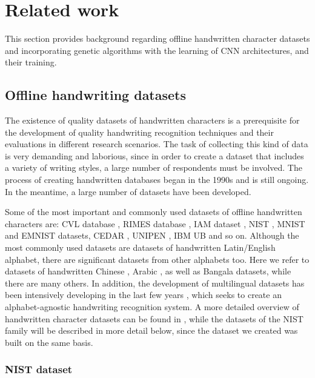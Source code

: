 \documentclass[eng]{simposium}
\begin{document}
\section{Related work} 

This section provides background regarding offline handwritten character datasets and incorporating genetic algorithms  
with the learning of CNN architectures, and their training.  

\subsection{Offline handwriting datasets} 

The existence of quality datasets of handwritten characters is a prerequisite for the development of quality handwriting  
recognition techniques and their evaluations in different research scenarios.  
The task of collecting this kind of data is very demanding and laborious, since in order to create a dataset that includes  
a variety of writing styles, a large number of respondents must be involved.  
The process of creating handwritten databases began in the 1990s \cite{9} and is still ongoing.  
In the meantime, a large number of datasets have been developed.  

Some of the most important and commonly used datasets of offline handwritten characters are: CVL database \cite{18}, RIMES database \cite{10}, 
IAM dataset \cite{11},  
NIST \cite{12,13}, MNIST \cite{8} and EMNIST \cite{1} datasets, CEDAR \cite{14}, UNIPEN \cite{15}, IBM UB \cite{16} and so on.  
Although the most commonly used datasets are datasets of handwritten Latin/English alphabet,  
there are significant datasets from other alphabets too.  
Here we refer to datasets of handwritten Chinese \cite{19,21,20}, Arabic \cite{22,23}, as well as Bangala \cite{24,25} datasets, 
while there are many others.  
In addition, the development of multilingual datasets has been intensively developing in the last few years \cite{17,26,18}, 
which seeks to create an alphabet-agnostic handwriting recognition system.  
A more detailed overview of handwritten character datasets can be found in \cite{9},  
while the datasets of the NIST family will be described in more detail below, since the dataset we created was built on the same basis.  

\subsubsection{NIST dataset} 
\end{document}
